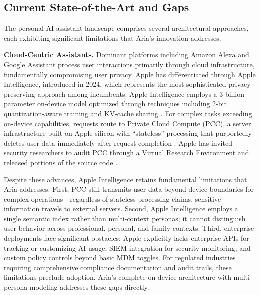 \documentclass[11pt]{article}
\begin{document}
\vspace*{-8pt}
\subsection{Current State-of-the-Art and Gaps}
\vspace*{-8pt}
The personal AI assistant landscape comprises several architectural approaches, each exhibiting significant limitations that Aria's innovation addresses.

\textbf{Cloud-Centric Assistants.} Dominant platforms including Amazon Alexa and 
Google Assistant process user interactions primarily through cloud infrastructure, 
fundamentally compromising user privacy. Apple has differentiated through Apple 
Intelligence, introduced in 2024, which represents the most sophisticated 
privacy-preserving approach among incumbents. Apple Intelligence employs a 
3-billion parameter on-device model optimized through techniques including 
2-bit quantization-aware training and KV-cache sharing \cite{apple2024foundation}. 
For complex tasks exceeding on-device capabilities, requests route to Private 
Cloud Compute (PCC), a server infrastructure built on Apple silicon with 
``stateless'' processing that purportedly deletes user data immediately after 
request completion \cite{apple2024pcc}. Apple has invited security researchers 
to audit PCC through a Virtual Research Environment and released portions of 
the source code \cite{apple2024pccresearch}.

Despite these advances, Apple Intelligence retains fundamental limitations that 
Aria addresses. First, PCC still transmits user data beyond device boundaries 
for complex operations---regardless of stateless processing claims, sensitive 
information travels to external servers. Second, Apple Intelligence employs a 
single semantic index rather than multi-context personas; it cannot distinguish 
user behavior across professional, personal, and family contexts. Third, 
enterprise deployments face significant obstacles: Apple explicitly lacks 
enterprise APIs for tracking or customizing AI usage, SIEM integration for 
security monitoring, and custom policy controls beyond basic MDM toggles. 
For regulated industries requiring comprehensive compliance documentation and 
audit trails, these limitations preclude adoption. Aria's complete on-device 
architecture with multi-persona modeling addresses these gaps directly.
\end{document}
